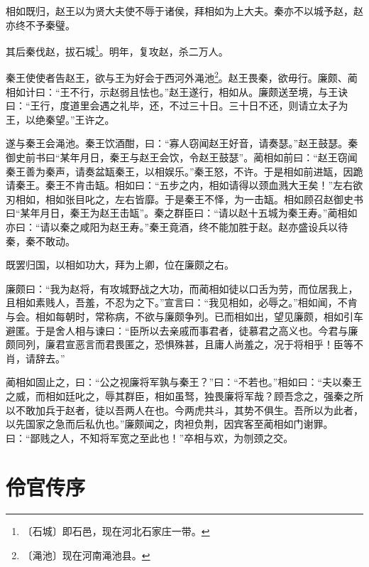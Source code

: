 \documentclass[12pt,UTF-8,openany]{ctexbook}
\begin{document}
\begin{normalsize}
    相如既归，赵王以为贤大夫使不辱于诸侯，拜相如为上大夫。秦亦不以城予赵，赵亦终不予秦璧。
    
    其后秦伐赵，拔石城\footnote{〔石城〕即石邑，现在河北石家庄一带。}。明年，复攻赵，杀二万人。
    
    秦王使使者告赵王，欲与王为好会于西河外渑池\footnote{〔渑池〕现在河南渑池县。}。赵王畏秦，欲毋行。廉颇、蔺相如计曰：“王不行，示赵弱且怯也。”赵王遂行，相如从。廉颇送至境，与王诀曰：“王行，度道里会遇之礼毕，还，不过三十日。三十日不还，则请立太子为王，以绝秦望。”王许之。
    
    遂与秦王会渑池。秦王饮酒酣，曰：“寡人窃闻赵王好音，请奏瑟。”赵王鼓瑟。秦御史前书曰“某年月日，秦王与赵王会饮，令赵王鼓瑟”。蔺相如前曰：“赵王窃闻秦王善为秦声，请奏盆缻秦王，以相娱乐。”秦王怒，不许。于是相如前进缻，因跪请秦王。秦王不肯击缻。相如曰：“五步之内，相如请得以颈血溅大王矣！”左右欲刃相如，相如张目叱之，左右皆靡。于是秦王不怿，为一击缻。相如顾召赵御史书曰“某年月日，秦王为赵王击缻”。秦之群臣曰：“请以赵十五城为秦王寿。”蔺相如亦曰：“请以秦之咸阳为赵王寿。”秦王竟酒，终不能加胜于赵。赵亦盛设兵以待秦，秦不敢动。
    
    既罢归国，以相如功大，拜为上卿，位在廉颇之右。
    
    廉颇曰：“我为赵将，有攻城野战之大功，而蔺相如徒以口舌为劳，而位居我上，且相如素贱人，吾羞，不忍为之下。”宣言曰：“我见相如，必辱之。”相如闻，不肯与会。相如每朝时，常称病，不欲与廉颇争列。已而相如出，望见廉颇，相如引车避匿。于是舍人相与谏曰：“臣所以去亲戚而事君者，徒慕君之高义也。今君与廉颇同列，廉君宣恶言而君畏匿之，恐惧殊甚，且庸人尚羞之，况于将相乎！臣等不肖，请辞去。”
    
    蔺相如固止之，曰：“公之视廉将军孰与秦王？”曰：“不若也。”相如曰：“夫以秦王之威，而相如廷叱之，辱其群臣，相如虽驽，独畏廉将军哉？顾吾念之，强秦之所以不敢加兵于赵者，徒以吾两人在也。今两虎共斗，其势不俱生。吾所以为此者，以先国家之急而后私仇也。”廉颇闻之，肉袒负荆，因宾客至蔺相如门谢罪。曰：“鄙贱之人，不知将军宽之至此也！”卒相与欢，为刎颈之交。
\end{normalsize}



\chapter{伶官传序}
\end{document}
